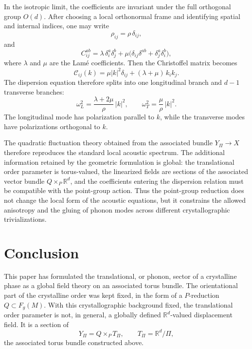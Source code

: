 \documentclass[11pt]{amsart}
\theoremstyle{plain}
\theoremstyle{definition}
\theoremstyle{remark}
\begin{document}
In the isotropic limit, the coefficients are invariant under the full orthogonal group \(O(d)\). 
After choosing a local orthonormal frame and identifying spatial and internal indices, one may write
\begin{equation}
	\rho_{ij}=\rho\,\delta_{ij},
	\label{eq:isotropic_density}
\end{equation}
and
\begin{equation}
	C^{ab}_{ij}
	=
	\lambda\,\delta^a_i\delta^b_j
	+
	\mu\bigl(\delta_{ij}\delta^{ab}+\delta^a_j\delta^b_i\bigr),
	\label{eq:isotropic_elasticity_tensor}
\end{equation}
where \(\lambda\) and \(\mu\) are the Lam\'e coefficients. 
Then the Christoffel matrix becomes
\begin{equation}
	\mathcal C_{ij}(k)
	=
	\mu |k|^2\delta_{ij}
	+
	(\lambda+\mu)\,k_i k_j.
	\label{eq:isotropic_christoffel}
\end{equation}
The dispersion equation therefore splits into one longitudinal branch and \(d-1\) transverse branches:
\begin{equation}
	\omega_L^2
	=
	\frac{\lambda+2\mu}{\rho}\,|k|^2,
	\qquad
	\omega_T^2
	=
	\frac{\mu}{\rho}\,|k|^2.
	\label{eq:longitudinal_transverse_dispersion}
\end{equation}
The longitudinal mode has polarization parallel to \(k\), while the transverse modes have polarizations orthogonal to \(k\).

\medskip

The quadratic fluctuation theory obtained from the associated bundle \(Y_\Pi\to X\) therefore reproduces the standard local acoustic spectrum. 
The additional information retained by the geometric formulation is global: the translational order parameter is torus-valued, the linearized fields are sections of the associated vector bundle \(Q\times_P\mathbb R^d\), and the coefficients entering the dispersion relation must be compatible with the point-group action. 
Thus the point-group reduction does not change the local form of the acoustic equations, but it constrains the allowed anisotropy and the gluing of phonon modes across different crystallographic trivializations.

\section{Conclusion}
\label{sec:conclusion}

This paper has formulated the translational, or phonon, sector of a crystalline phase as a global field theory on an associated torus bundle. 
The orientational part of the crystalline order was kept fixed, in the form of a \(P\)-reduction \(Q\subset F_g(M)\). 
With this crystallographic background fixed, the translational order parameter is not, in general, a globally defined \(\mathbb R^d\)-valued displacement field. 
It is a section of
\[
Y_\Pi=Q\times_P T_\Pi,
\qquad
T_\Pi=\mathbb R^d/\Pi,
\]
the associated torus bundle constructed above.
\end{document}
